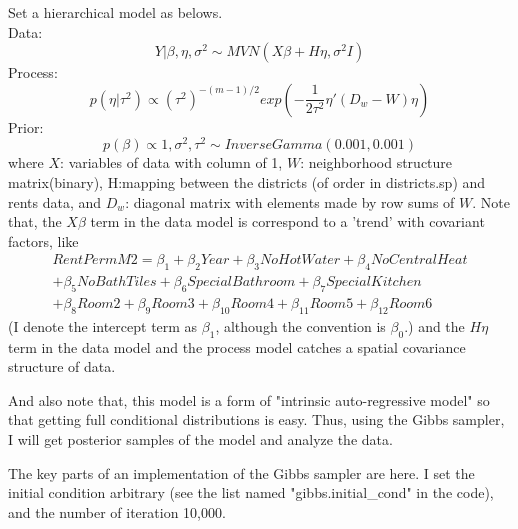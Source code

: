 \documentclass{article}
\begin{document}
Set a hierarchical model as belows. \\
Data:
\[Y|\beta,\eta,\sigma^2 \sim MVN(X\beta+H\eta, \sigma^2I)\]
Process:
\[p(\eta|\tau^2) \propto (\tau^2)^{-(m-1)/2} exp{(-\frac{1}{2\tau^2}\eta'(D_w-W)\eta)}\]
Prior:
\[p(\beta)\propto 1 , \sigma^2,\tau^2 \sim InverseGamma(0.001, 0.001)\]
where $X$: variables of data with column of 1, $W$: neighborhood structure matrix(binary), H:mapping between the districts (of order in districts.sp) and rents data,
and $D_w$: diagonal matrix with elements made by row sums of $W$.
Note that, the $X\beta$ term in the data model is correspond to a 'trend' with covariant factors, like
\begin{align*}
    RentPermM2 = \beta_1 + \beta_2 Year + \beta_3 NoHotWater + \beta_4 NoCentralHeat \\
    + \beta_5 NoBathTiles + \beta_6 SpecialBathroom + \beta_7 SpecialKitchen\\
    + \beta_8 Room2 + \beta_9 Room3 + \beta_10 Room4 + \beta_11 Room5 + \beta_12 Room6
\end{align*}
(I denote the intercept term as $\beta_1$, although the convention is $\beta_0$.)
and the $H\eta$ term in the data model and the process model catches a spatial covariance structure of data.

And also note that, this model is a form of "intrinsic auto-regressive model" so that getting full conditional distributions is easy.
Thus, using the Gibbs sampler, I will get posterior samples of the model and analyze the data.

The key parts of an implementation of the Gibbs sampler are here. 
I set the initial condition arbitrary (see the list named "gibbs.initial\_cond" in the code), 
and the number of iteration 10,000.
\end{document}
